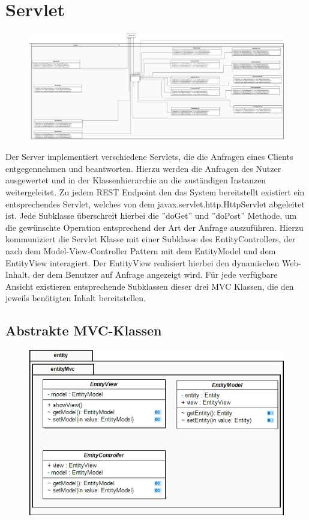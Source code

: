 \section{Servlet}

\begin{figure}[h]
\includegraphics[width=1.0\linewidth]{Grafik/Klassendiagramme/Servlet.png}
\end{figure}


Der Server implementiert verschiedene Servlets, die die Anfragen eines Clients entgegennehmen und beantworten. Hierzu werden die Anfragen des Nutzer ausgewertet und in der Klassenhierarchie an die zuständigen Instanzen weitergeleitet. Zu jedem REST Endpoint den das System bereitstellt existiert ein entsprechendes Servlet, welches von dem javax.servlet.http.HttpServlet abgeleitet ist. Jede Subklasse überschreit hierbei die ''doGet'' und ''doPost'' Methode, um die gewünschte Operation entsprechend der Art der Anfrage auszuführen. Hierzu kommuniziert die Servlet Klasse mit einer Subklasse des EntityControllers, der nach dem Model-View-Controller Pattern mit dem EntityModel und dem EntityView interagiert. Der EntityView realisiert hierbei den dynamischen Web-Inhalt, der dem Benutzer auf Anfrage angezeigt wird. Für jede verfügbare Ansicht existieren entsprechende Subklassen dieser drei MVC Klassen, die den jeweils benötigten Inhalt bereitstellen. 


\subsection{Abstrakte MVC-Klassen}

\begin{figure}[h]
\centering
\includegraphics[width=0.5\linewidth]{Grafik/Klassendiagramme/Entity_mvc.png}
\end{figure}

